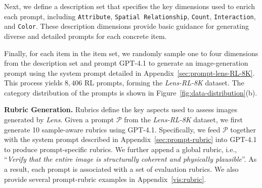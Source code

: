 Next, we define a description set that specifies the key dimensions used to enrich each prompt, including \texttt{Attribute}, \texttt{Spatial Relationship}, \texttt{Count}, \texttt{Interaction}, and \texttt{Color}. These description dimensions provide basic guidance for generating diverse and detailed prompts for each concrete item.


Finally, for each item in the item set, we randomly sample one to four dimensions from the description set and prompt GPT-4.1 to generate an image-generation prompt using the system prompt detailed in Appendix~\ref{sec:prompt-lens-RL-8K}. This process yields $8,406$ RL prompts, forming the \textit{Lens-RL-8K} dataset. The category distribution of the prompts is shown in Figure~\ref{fig:data-distribution}(b).



\noindent\textbf{Rubric Generation.}
Rubrics define the key aspects used to assess images generated by \textit{Lens}. Given a prompt $\mathcal{P}$ from the \textit{Lens-RL-8K} dataset, we first generate 10 sample-aware rubrics using GPT-4.1. Specifically, we feed $\mathcal{P}$ together with the system prompt described in Appendix~\ref{sec:prompt-rubric} into GPT-4.1 to produce prompt-specific rubrics. We further append a global rubric, i.e., ``\textit{Verify that the entire image is structurally coherent and physically plausible}''. As a result, each prompt is associated with a set of evaluation rubrics. We also provide several prompt-rubric examples in Appendix~\ref{vis:rubric}.

